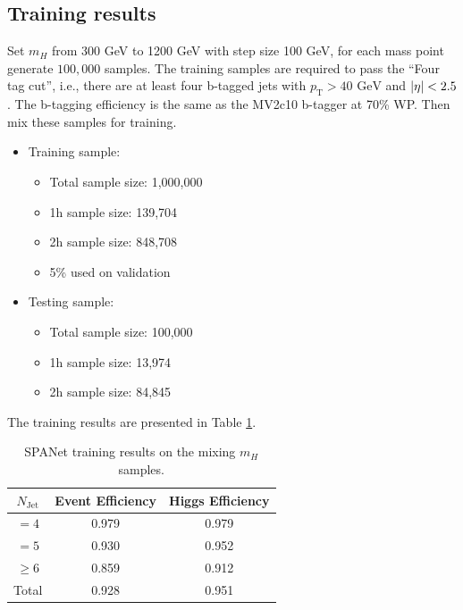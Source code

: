 \documentclass[12pt]{article}
\begin{document}
	\subsection{Training results}%
	\label{sub:training_results_mix}
		Set $m_H$ from 300 GeV to 1200 GeV with step size 100 GeV, for each mass point generate $100,000$ samples. The training samples are required to pass the ``Four tag cut'', i.e., there are at least four b-tagged jets with $p_{\text{T}} > \text{40 GeV}$ and $\abs{\eta} < 2.5$. The b-tagging efficiency is the same as the MV2c10 b-tagger at 70\% WP. Then mix these samples for training. 
		\begin{itemize}
			\item Training sample:
			\begin{itemize}
				\item Total sample size: 1,000,000
				\item 1h sample size: 139,704
				\item 2h sample size: 848,708
				\item 5\% used on validation
			\end{itemize}
			\item Testing sample: 
			\begin{itemize}
				\item Total sample size: 100,000
				\item 1h sample size: 13,974
				\item 2h sample size: 84,845
			\end{itemize}
		\end{itemize}
		The training results are presented in Table \ref{tab:SPANet_diHiggs_4btag_pt40_mix_resonant}.
		\begin{table}[htpb]
			\centering
			\caption{SPANet training results on the mixing $m_H$ samples.}
			\label{tab:SPANet_diHiggs_4btag_pt40_mix_resonant}
			\begin{tabular}{c|cc}
				$N_\text{Jet}$ & Event Efficiency & Higgs Efficiency \\
				\hline
				$=4$	  &      0.979              &    0.979             \\
				$=5$	  &      0.930              &    0.952             \\
				$\ge 6$	  &      0.859              &    0.912             \\
				\hline
				Total	  &      0.928              &    0.951             \\
			\end{tabular}
		\end{table}
		
\end{document}
